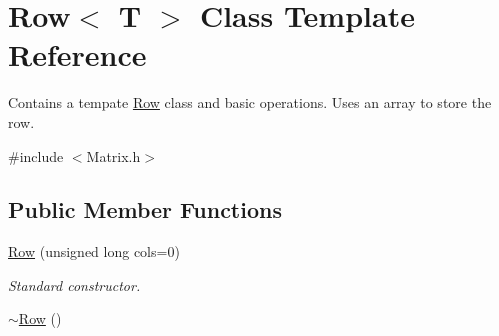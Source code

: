 \hypertarget{class_row}{}\section{Row$<$ T $>$ Class Template Reference}
\label{class_row}


Contains a tempate \hyperlink{class_row}{Row} class and basic operations. Uses an array to store the row.  




{\ttfamily \#include $<$Matrix.\+h$>$}

\subsection*{Public Member Functions}
\begin{DoxyCompactItemize}
\item 
\hyperlink{class_row_a32774cba0d7cdb6f0d7100c395ece9e5}{Row} (unsigned long cols=0)
\begin{DoxyCompactList}\small\item\em Standard constructor. \end{DoxyCompactList}\item 
\hyperlink{class_row_a8e888a33060156cd2e3757a95e9feee1}{$\sim$\+Row} ()\hypertarget{class_row_a8e888a33060156cd2e3757a95e9feee1}{}\label{class_row_a8e888a33060156cd2e3757a95e9feee1}


\end{DoxyCompactItemize}
